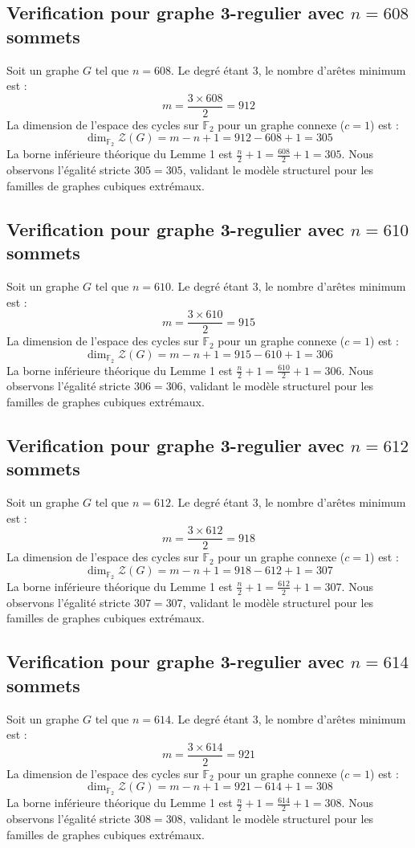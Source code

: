 \documentclass[11pt,a4paper]{article}
\begin{document}
\subsection{Verification pour graphe 3-regulier avec $n=608$ sommets}
Soit un graphe $G$ tel que $n = 608$. Le degré étant 3, le nombre d'arêtes minimum est :
$$ m = \frac{3 \times 608}{2} = 912 $$
La dimension de l'espace des cycles sur $\mathbb{F}_2$ pour un graphe connexe ($c=1$) est :
$$ \dim_{\mathbb{F}_2} \mathcal{Z}(G) = m - n + 1 = 912 - 608 + 1 = 305 $$
La borne inférieure théorique du Lemme 1 est $\frac{n}{2} + 1 = \frac{608}{2} + 1 = 305$.
Nous observons l'égalité stricte $305 = 305$, validant le modèle structurel pour les familles de graphes cubiques extrémaux.

\subsection{Verification pour graphe 3-regulier avec $n=610$ sommets}
Soit un graphe $G$ tel que $n = 610$. Le degré étant 3, le nombre d'arêtes minimum est :
$$ m = \frac{3 \times 610}{2} = 915 $$
La dimension de l'espace des cycles sur $\mathbb{F}_2$ pour un graphe connexe ($c=1$) est :
$$ \dim_{\mathbb{F}_2} \mathcal{Z}(G) = m - n + 1 = 915 - 610 + 1 = 306 $$
La borne inférieure théorique du Lemme 1 est $\frac{n}{2} + 1 = \frac{610}{2} + 1 = 306$.
Nous observons l'égalité stricte $306 = 306$, validant le modèle structurel pour les familles de graphes cubiques extrémaux.

\subsection{Verification pour graphe 3-regulier avec $n=612$ sommets}
Soit un graphe $G$ tel que $n = 612$. Le degré étant 3, le nombre d'arêtes minimum est :
$$ m = \frac{3 \times 612}{2} = 918 $$
La dimension de l'espace des cycles sur $\mathbb{F}_2$ pour un graphe connexe ($c=1$) est :
$$ \dim_{\mathbb{F}_2} \mathcal{Z}(G) = m - n + 1 = 918 - 612 + 1 = 307 $$
La borne inférieure théorique du Lemme 1 est $\frac{n}{2} + 1 = \frac{612}{2} + 1 = 307$.
Nous observons l'égalité stricte $307 = 307$, validant le modèle structurel pour les familles de graphes cubiques extrémaux.

\subsection{Verification pour graphe 3-regulier avec $n=614$ sommets}
Soit un graphe $G$ tel que $n = 614$. Le degré étant 3, le nombre d'arêtes minimum est :
$$ m = \frac{3 \times 614}{2} = 921 $$
La dimension de l'espace des cycles sur $\mathbb{F}_2$ pour un graphe connexe ($c=1$) est :
$$ \dim_{\mathbb{F}_2} \mathcal{Z}(G) = m - n + 1 = 921 - 614 + 1 = 308 $$
La borne inférieure théorique du Lemme 1 est $\frac{n}{2} + 1 = \frac{614}{2} + 1 = 308$.
Nous observons l'égalité stricte $308 = 308$, validant le modèle structurel pour les familles de graphes cubiques extrémaux.
\end{document}
